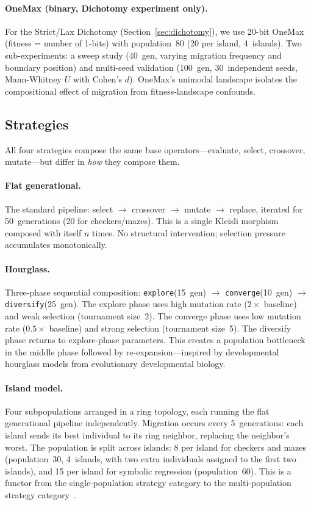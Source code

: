 \documentclass[sigconf]{acmart}
\begin{document}
\paragraph{OneMax (binary, Dichotomy experiment only).}
For the Strict/Lax Dichotomy (Section~\ref{sec:dichotomy}), we use 20-bit OneMax (fitness = number of 1-bits) with population~80 (20 per island, 4~islands). Two sub-experiments: a sweep study (40~gen, varying migration frequency and boundary position) and multi-seed validation (100~gen, 30~independent seeds, Mann-Whitney $U$ with Cohen's $d$). OneMax's unimodal landscape isolates the compositional effect of migration from fitness-landscape confounds.

\subsection{Strategies}

All four strategies compose the same base operators---evaluate, select, crossover, mutate---but differ in \emph{how} they compose them.

\paragraph{Flat generational.}
The standard pipeline: select $\to$ crossover $\to$ mutate $\to$ replace, iterated for 50~generations (20 for checkers/mazes). This is a single Kleisli morphism composed with itself $n$ times. No structural intervention; selection pressure accumulates monotonically.

\paragraph{Hourglass.}
Three-phase sequential composition: \texttt{explore}(15~gen) $\to$ \texttt{converge}(10~gen) $\to$ \texttt{diversify}(25~gen). The explore phase uses high mutation rate ($2\times$ baseline) and weak selection (tournament size~2). The converge phase uses low mutation rate ($0.5\times$ baseline) and strong selection (tournament size~5). The diversify phase returns to explore-phase parameters. This creates a population bottleneck in the middle phase followed by re-expansion---inspired by developmental hourglass models from evolutionary developmental biology.

\paragraph{Island model.}
Four subpopulations arranged in a ring topology, each running the flat generational pipeline independently. Migration occurs every 5~generations: each island sends its best individual to its ring neighbor, replacing the neighbor's worst. The population is split across islands: 8 per island for checkers and mazes (population~30, 4~islands, with two extra individuals assigned to the first two islands), and 15 per island for symbolic regression (population~60). This is a functor from the single-population strategy category to the multi-population strategy category~\cite{whitley1999island, skolicki2005influence}.
\end{document}
